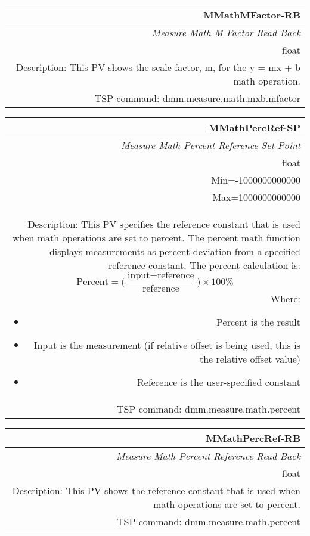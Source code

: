 \documentclass[openany]{article}
\begin{document}
		\begin{tabular}{N}
			\hline
			\bfseries MMathMFactor-RB\label{pv:mmathmfactor-rb} \\ \hline
			\emph{Measure Math M Factor Read Back} \\
			float \\
			Description: This PV shows the scale factor, m, for the y = mx + b math operation. \\
			TSP command: dmm.measure.math.mxb.mfactor
		\end{tabular}

		\begin{tabular}{N}
			\hline
			\bfseries MMathPercRef-SP\label{pv:mmathpercref-sp} \\ \hline
			\emph{Measure Math Percent Reference Set Point} \\
			float \\
			Min=-1000000000000 \\
			Max=1000000000000 \\
			Description: This PV specifies the reference constant that is used when math operations are set to percent. The percent math function displays measurements as percent deviation from a specified reference constant. The percent calculation is: $$ \text{Percent} = \bigg(\frac{\text{input} - \text{reference}}{\text{reference}}\bigg)\times 100\% $$ Where: \begin{itemize} \item Percent is the result
\item Input is the measurement (if relative offset is being used, this is the relative offset value) \item Reference is the user-specified constant \end{itemize} \\
			TSP command: dmm.measure.math.percent
		\end{tabular}

		\begin{tabular}{N}
			\hline
			\bfseries MMathPercRef-RB\label{pv:mmathpercref-rb} \\ \hline
			\emph{Measure Math Percent Reference Read Back} \\
			float \\
			Description: This PV shows the reference constant that is used when math operations are set to percent. \\
			TSP command: dmm.measure.math.percent
		\end{tabular}
\end{document}
